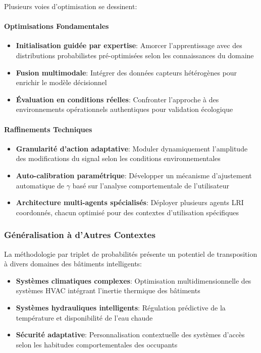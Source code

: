 \documentclass[a4paper,11pt]{article}
\begin{document}
Plusieurs voies d'optimisation se dessinent:

\paragraph{Optimisations Fondamentales}
\begin{itemize}
    \item \textbf{Initialisation guidée par expertise}: Amorcer l'apprentissage avec des distributions probabilistes pré-optimisées selon les connaissances du domaine
    \item \textbf{Fusion multimodale}: Intégrer des données capteurs hétérogènes pour enrichir le modèle décisionnel
    \item \textbf{Évaluation en conditions réelles}: Confronter l'approche à des environnements opérationnels authentiques pour validation écologique
\end{itemize}

\paragraph{Raffinements Techniques}
\begin{itemize}
    \item \textbf{Granularité d'action adaptative}: Moduler dynamiquement l'amplitude des modifications du signal selon les conditions environnementales
    \item \textbf{Auto-calibration paramétrique}: Développer un mécanisme d'ajustement automatique de $\gamma$ basé sur l'analyse comportementale de l'utilisateur
    \item \textbf{Architecture multi-agents spécialisés}: Déployer plusieurs agents LRI coordonnés, chacun optimisé pour des contextes d'utilisation spécifiques
\end{itemize}

\subsubsection{Généralisation à d'Autres Contextes}

La méthodologie par triplet de probabilités présente un potentiel de transposition à divers domaines des bâtiments intelligents:

\begin{itemize}
    \item \textbf{Systèmes climatiques complexes}: Optimisation multidimensionnelle des systèmes HVAC intégrant l'inertie thermique des bâtiments
    \item \textbf{Systèmes hydrauliques intelligents}: Régulation prédictive de la température et disponibilité de l'eau chaude
    \item \textbf{Sécurité adaptative}: Personnalisation contextuelle des systèmes d'accès selon les habitudes comportementales des occupants
\end{itemize}
\end{document}
